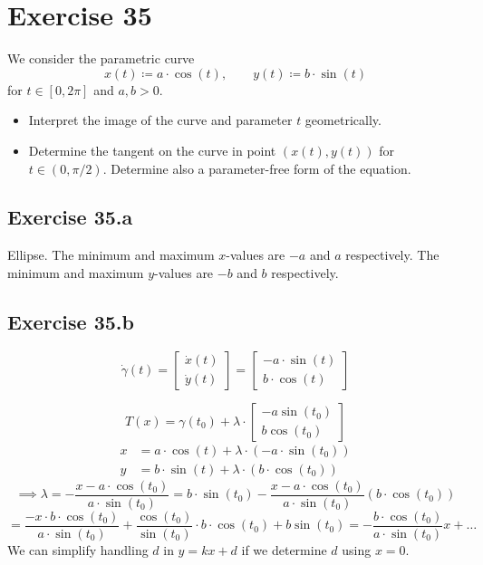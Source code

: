 \documentclass[a4paper]{article}
\theoremstyle{definition}
\begin{document}
\section{Exercise 35}
\begin{ex}
  We consider the parametric curve
  \[ x(t) \coloneqq a \cdot \cos(t), \qquad y(t) \coloneqq b \cdot \sin(t) \]
  for $t \in [0,2\pi]$ and $a,b > 0$.
  \begin{itemize}
  \item Interpret the image of the curve and parameter $t$ geometrically.
  \item Determine the tangent on the curve in point $(x(t), y(t))$ for $t \in (0, \pi/2)$. Determine also a parameter-free form of the equation.
  \end{itemize}
\end{ex}

\subsection{Exercise 35.a}
%
Ellipse. The minimum and maximum $x$-values are $-a$ and $a$ respectively.
The minimum and maximum $y$-values are $-b$ and $b$ respectively.

\subsection{Exercise 35.b}

\[
  \dot{\gamma}(t)
  = \begin{bmatrix} \dot{x}(t) \\ \dot{y}(t) \end{bmatrix}
  = \begin{bmatrix} -a \cdot \sin(t) \\ b \cdot \cos(t) \end{bmatrix}
\]

\[ T(x) = \gamma(t_0) + \lambda \cdot \begin{bmatrix} -a \sin(t_0) \\ b \cos(t_0) \end{bmatrix} \]
\begin{align*}
  x &= a \cdot \cos(t) + \lambda \cdot (-a \cdot \sin(t_0)) \\
  y &= b \cdot \sin(t) + \lambda \cdot (b \cdot \cos(t_0))
\end{align*}
\[
  \implies \lambda = -\frac{x - a \cdot \cos(t_0)}{a \cdot \sin(t_0)}
  = b \cdot \sin(t_0) - \frac{x - a \cdot \cos(t_0)}{a \cdot \sin(t_0)} (b \cdot \cos(t_0))
\] \[
  = \frac{-x \cdot b \cdot \cos(t_0)}{a \cdot \sin(t_0)} + \frac{\cos(t_0)}{\sin(t_0)} \cdot b \cdot \cos(t_0) + b \sin(t_0) = -\frac{b \cdot \cos(t_0)}{a \cdot \sin(t_0)} x + \ldots
  \]
We can simplify handling $d$ in $y = kx + d$ if we determine $d$ using $x = 0$.
\end{document}
